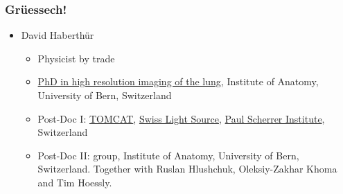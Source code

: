 \begin{frame}
	\frametitle{Grüessech!}
	\begin{itemize}
		\item David Haberthür
		\begin{itemize}
			\item Physicist by trade
			\item \href{https://boris.unibe.ch/2619/}{PhD in high resolution imaging of the lung}, Institute of Anatomy, University of Bern, Switzerland
			\item Post-Doc I: \href{https://www.psi.ch/sls/tomcat/}{TOMCAT}, \href{https://www.psi.ch/sls/}{Swiss Light Source}, \href{https://www.psi.ch/}{Paul Scherrer Institute}, Switzerland
			\item Post-Doc II: \uct group, Institute of Anatomy, University of Bern, Switzerland.\newline
				Together with Ruslan Hlushchuk, Oleksiy-Zakhar Khoma and Tim Hoessly.
		\end{itemize}
	\end{itemize}
\end{frame}

